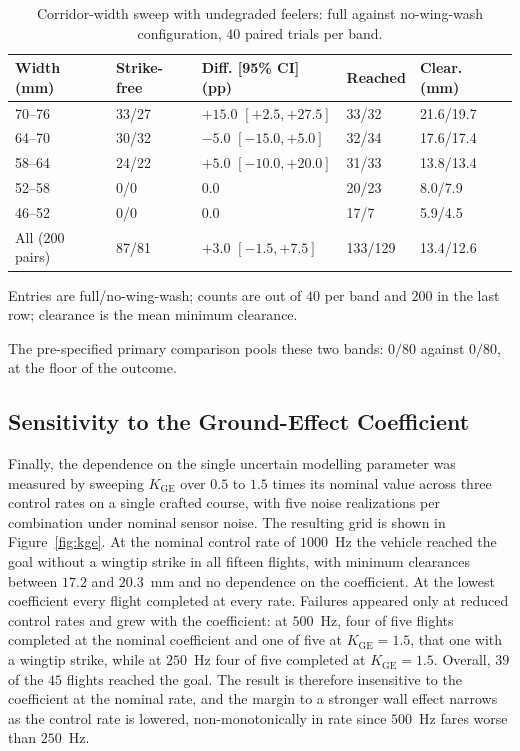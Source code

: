 \documentclass[final,5p,times]{elsarticle}
\begin{document}
\begin{table}[t]
\centering
\begin{threeparttable}
\caption{Corridor-width sweep with undegraded feelers: full against no-wing-wash configuration, $40$ paired trials per band.}
\label{tab:width}
\footnotesize\setlength{\tabcolsep}{2pt}
\begin{tabular*}{\columnwidth}{@{\extracolsep{\fill}}lllll@{}}
\toprule
Width (mm) & Strike-free & Diff. [95\% CI] (pp) & Reached & Clear. (mm) \\
\midrule
70--76 & 33/27 & $+15.0$ $[+2.5, +27.5]$ & 33/32 & 21.6/19.7 \\
64--70 & 30/32 & $-5.0$ $[-15.0, +5.0]$ & 32/34 & 17.6/17.4 \\
58--64 & 24/22 & $+5.0$ $[-10.0, +20.0]$ & 31/33 & 13.8/13.4 \\
52--58\tnote{a} & 0/0 & $0.0$ & 20/23 & 8.0/7.9 \\
46--52\tnote{a} & 0/0 & $0.0$ & 17/7 & 5.9/4.5 \\
\midrule
All ($200$ pairs) & 87/81 & $+3.0$ $[-1.5, +7.5]$ & 133/129 & 13.4/12.6 \\
\bottomrule
\end{tabular*}
\begin{tablenotes}\footnotesize
\item Entries are full/no-wing-wash; counts are out of $40$ per band and $200$ in the last row; clearance is the mean minimum clearance.
\item[a] The pre-specified primary comparison pools these two bands: $0/80$ against $0/80$, at the floor of the outcome.
\end{tablenotes}
\end{threeparttable}
\end{table}

\subsection{Sensitivity to the Ground-Effect Coefficient}
\label{sec:results_sensitivity}

Finally, the dependence on the single uncertain modelling parameter was measured by sweeping $K_{\mathrm{GE}}$ over $0.5$ to $1.5$ times its nominal value across three control rates on a single crafted course, with five noise realizations per combination under nominal sensor noise. The resulting grid is shown in Figure~\ref{fig:kge}. At the nominal control rate of $1000$~Hz the vehicle reached the goal without a wingtip strike in all fifteen flights, with minimum clearances between $17.2$ and $20.3$~mm and no dependence on the coefficient. At the lowest coefficient every flight completed at every rate. Failures appeared only at reduced control rates and grew with the coefficient: at $500$~Hz, four of five flights completed at the nominal coefficient and one of five at $K_{\mathrm{GE}} = 1.5$, that one with a wingtip strike, while at $250$~Hz four of five completed at $K_{\mathrm{GE}} = 1.5$. Overall, $39$ of the $45$ flights reached the goal. The result is therefore insensitive to the coefficient at the nominal rate, and the margin to a stronger wall effect narrows as the control rate is lowered, non-monotonically in rate since $500$~Hz fares worse than $250$~Hz.
\end{document}
